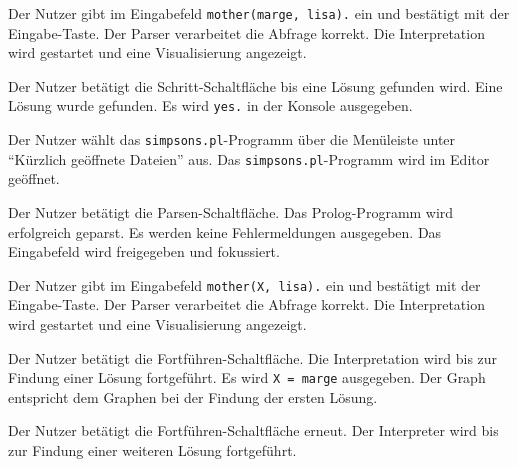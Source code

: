 \documentclass[parskip=full,11pt,twoside]{scrartcl}
\begin{document}
{Der Nutzer gibt im Eingabefeld \texttt{mother(marge, lisa).} ein und bestätigt mit der Eingabe-Taste.}
{Der Parser verarbeitet die Abfrage korrekt. Die Interpretation wird gestartet und eine Visualisierung angezeigt.}

{Der Nutzer betätigt die Schritt-Schaltfläche bis eine Lösung gefunden wird.}
{Eine Lösung wurde gefunden. Es wird \texttt{yes.} in der Konsole ausgegeben.}


{Der Nutzer wählt das \texttt{simpsons.pl}-Programm über die Menüleiste unter \enquote{Kürzlich geöffnete Dateien} aus.}
{Das \texttt{simpsons.pl}-Programm wird im Editor geöffnet.}

{Der Nutzer betätigt die Parsen-Schaltfläche.}
{Das Prolog-Programm wird erfolgreich geparst. Es werden keine Fehlermeldungen ausgegeben. Das Eingabefeld wird freigegeben und fokussiert.}

{Der Nutzer gibt im Eingabefeld \texttt{mother(X, lisa).} ein und bestätigt mit der Eingabe-Taste.}
{Der Parser verarbeitet die Abfrage korrekt. Die Interpretation wird gestartet und eine Visualisierung angezeigt.}

{Der Nutzer betätigt die Fortführen-Schaltfläche.}
{Die Interpretation wird bis zur Findung einer Lösung fortgeführt. Es wird \texttt{X = marge} ausgegeben. Der Graph entspricht dem Graphen bei der Findung der ersten Lösung.}

{Der Nutzer betätigt die Fortführen-Schaltfläche erneut.}
{Der Interpreter wird bis zur Findung einer weiteren Lösung fortgeführt.}
\end{document}
